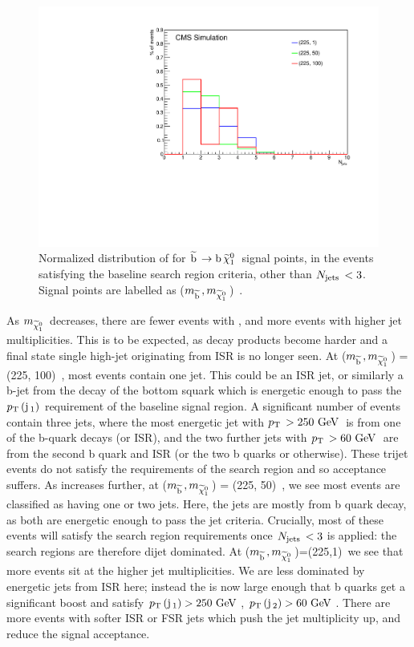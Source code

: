 \begin{figure}[!Hhtb]
  \begin{center}
  \includegraphics[scale=0.39]{Figures/sus13009/Njets_225_Norm.pdf}
  \caption{Normalized distribution of \njets for $\widetilde{{\rm b}}\, \rightarrow {\rm b}\, \widetilde{\chi}^{0}_{1}\,$ signal points, in the events satisfying the baseline search region criteria, other than $N_{\text{jets}}\,<3$. Signal points are labelled as ($m_{\widetilde{{\rm b}}\,}, m_{\widetilde{\chi}^{0}_{1}\,}$)~\GeV.}
  \label{fig:sbot225njets}
  \end{center}
\end{figure}

As $m_{\widetilde{\chi}^{0}_{1}\,}$ decreases, there are fewer events with , and more events with higher jet multiplicities. 
This is to be expected, as decay products become harder and a final state single high-\pt jet originating from \ac{ISR} is no longer seen. 
At ($m_{\widetilde{{\rm b}}\,},m_{\widetilde{\chi}^{0}_{1}\,}$) = (225, 100)~\GeV, most events contain one jet. This could be an ISR jet, or similarly a b-jet from the decay of the bottom squark which is energetic enough to pass the $p_{\text{T}}\,({\rm j}\,_1)$ requirement of the baseline signal region.
A significant number of events contain three jets, where the most energetic jet with $p_{\text{T}}\,>250~\mathrm{GeV}\,$ is from one of the b-quark decays (or \ac{ISR}), and the two further jets with $p_{\text{T}}\,>60~\mathrm{GeV}\,$ are from the second b quark and ISR (or the two b quarks or otherwise). 
These trijet events do not satisfy the requirements of the search region and so acceptance suffers. 
As \dmsbot increases further, at ($m_{\widetilde{{\rm b}}\,},m_{\widetilde{\chi}^{0}_{1}\,}$) = (225, 50)~\GeV, we see most events are classified as having one or two jets. 
Here, the jets are mostly from b quark decay, as both are energetic enough to pass the jet criteria.
Crucially, most of these events will satisfy the search region requirements once $N_{\text{jets}}\,<3$ is applied: the search regions are therefore dijet dominated.
At ($m_{\widetilde{{\rm b}}\,},m_{\widetilde{\chi}^{0}_{1}\,}$)=(225,1)~\GeV we see that more events sit at the higher jet multiplicities. 
We are less dominated by energetic jets from ISR here; instead the \dmsbot is now large enough that b quarks get a significant boost and satisfy $p_{\text{T}}\,({\rm j}\,_1)>250~\mathrm{GeV}\,$, $p_{\text{T}}\,({\rm j}\,_2)>60~\mathrm{GeV}\,$. There are more events with softer ISR or FSR jets which push the jet multiplicity up, and reduce the signal acceptance.

